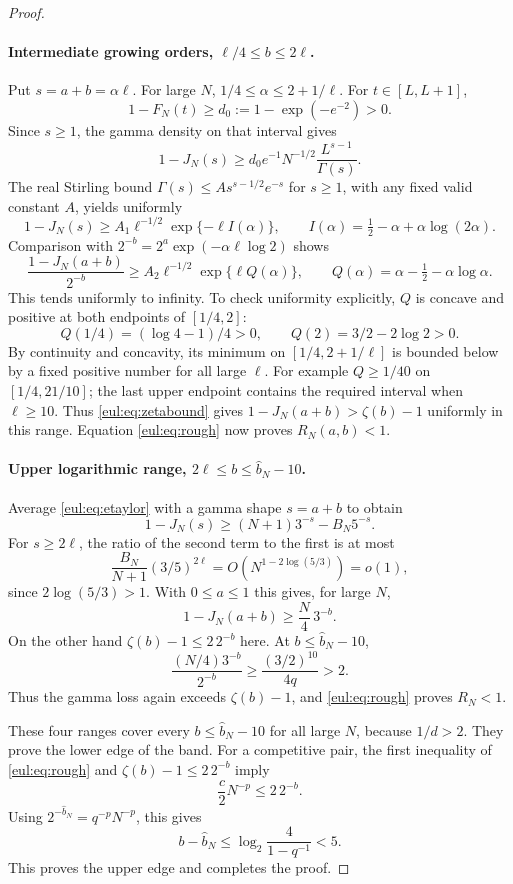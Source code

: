 \documentclass[11pt]{article}
\numberwithin{equation}{section}
\theoremstyle{definition}
\theoremstyle{remark}
\begin{document}
\begin{proof}
\paragraph{Intermediate growing orders, $\ell/4\leq b\leq2\ell$.}
Put $s=a+b=\alpha\ell$.  For large $N$,
$1/4\leq\alpha\leq2+1/\ell$.  For $t\in[L,L+1]$,
\[
 1-F_N(t)\geq d_0:=1-\exp(-e^{-2})>0.
\]
Since $s\geq1$, the gamma density on that interval gives
\begin{equation}\label{eul:eq:tailwindow}
 1-J_N(s)\geq
 d_0e^{-1}N^{-1/2}\frac{L^{s-1}}{\Gamma(s)}.
\end{equation}
The real Stirling bound $\Gamma(s)\leq A s^{s-1/2}e^{-s}$ for
$s\geq1$, with any fixed valid constant $A$, yields uniformly
\[
 1-J_N(s)\geq A_1\ell^{-1/2}\exp\{-\ell I(\alpha)\},
 \qquad I(\alpha)=\tfrac12-\alpha+\alpha\log(2\alpha).
\]
Comparison with $2^{-b}=2^a\exp(-\alpha\ell\log2)$ shows
\[
 \frac{1-J_N(a+b)}{2^{-b}}
 \geq A_2\ell^{-1/2}\exp\{\ell Q(\alpha)\},
 \qquad Q(\alpha)=\alpha-\tfrac12-\alpha\log\alpha.
\]
This tends uniformly to infinity.  To check uniformity explicitly,
$Q$ is concave and positive at both endpoints of $[1/4,2]$:
\[
 Q(1/4)=(\log4-1)/4>0,\qquad Q(2)=3/2-2\log2>0.
\]
By continuity and concavity, its minimum on
$[1/4,2+1/\ell]$ is bounded below by a fixed positive number for all
large $\ell$.  For example $Q\geq1/40$ on $[1/4,21/10]$;
the last upper endpoint contains the required interval when $\ell\geq10$.
Thus \eqref{eul:eq:zetabound} gives
$1-J_N(a+b)>\zeta(b)-1$ uniformly in this range.  Equation
\eqref{eul:eq:rough} now proves $R_N(a,b)<1$.

\paragraph{Upper logarithmic range, $2\ell\leq b\leq\widehat b_N-10$.}
Average \eqref{eul:eq:etaylor} with a gamma shape $s=a+b$ to obtain
\[
 1-J_N(s)\geq(N+1)3^{-s}-B_N5^{-s}.
\]
For $s\geq2\ell$, the ratio of the second term to the first is at most
\[
 \frac{B_N}{N+1}(3/5)^{2\ell}
   =O\!\left(N^{1-2\log(5/3)}\right)=o(1),
\]
since $2\log(5/3)>1$.  With $0\leq a\leq1$ this gives, for large $N$,
\[
 1-J_N(a+b)\geq\frac N4\,3^{-b}.
\]
On the other hand $\zeta(b)-1\leq2\,2^{-b}$ here.  At
$b\leq\widehat b_N-10$,
\[
 \frac{(N/4)3^{-b}}{2^{-b}}
 \geq\frac{(3/2)^{10}}{4q}>2.
\]
Thus the gamma loss again exceeds $\zeta(b)-1$, and
\eqref{eul:eq:rough} proves $R_N<1$.

These four ranges cover every $b\leq\widehat b_N-10$ for all large
$N$, because $1/d>2$.  They prove the lower edge of the band.
For a competitive pair, the first inequality of \eqref{eul:eq:rough} and
$\zeta(b)-1\leq2\,2^{-b}$ imply
\[
 \frac c2N^{-p}\leq2\,2^{-b}.
\]
Using $2^{-\widehat b_N}=q^{-p}N^{-p}$, this gives
\[
 b-\widehat b_N\leq\log_2\frac4{1-q^{-1}}<5.
\]
This proves the upper edge and completes the proof.
\end{proof}
\end{document}
